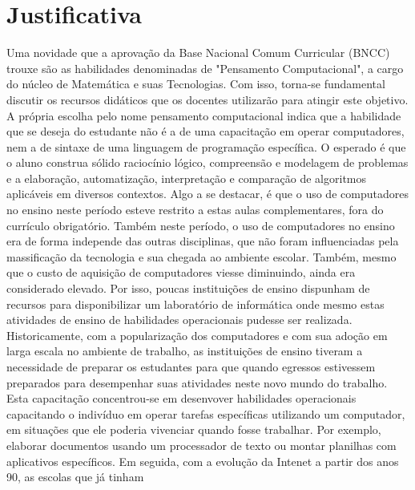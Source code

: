 \documentclass[12pt]{abntex2}
\begin{document}
\imprimircapa
\imprimirfolhaderosto
\section{Justificativa}
Uma novidade que a aprovação da Base Nacional Comum Curricular (BNCC) trouxe são as habilidades denominadas de "Pensamento Computacional", a cargo do núcleo de Matemática e suas Tecnologias. Com isso, torna-se fundamental discutir os recursos didáticos que os docentes utilizarão para atingir este objetivo. A própria escolha pelo nome pensamento computacional indica que a habilidade que se deseja do estudante não é a de uma capacitação em operar computadores, nem a de sintaxe de uma linguagem de programação específica. O esperado é que o aluno construa sólido raciocínio lógico, compreensão e modelagem de problemas e a elaboração, automatização, interpretação e comparação de algoritmos aplicáveis em diversos contextos. Algo a se destacar, é que o uso de computadores no ensino neste período esteve restrito a estas aulas complementares, fora do currículo obrigatório. Também neste período, o uso de computadores no ensino era de forma independe das outras disciplinas, que não foram influenciadas pela massificação da tecnologia e sua chegada ao ambiente escolar.
Também, mesmo que o custo de aquisição de computadores viesse diminuindo, ainda era considerado elevado. Por isso, poucas instituições de ensino dispunham de recursos para disponibilizar um laboratório de informática onde mesmo estas atividades de ensino de habilidades operacionais pudesse ser realizada. 
\\
Historicamente, com a popularização dos computadores e com sua adoção em larga escala no ambiente de trabalho, as instituições de ensino tiveram a necessidade de preparar os estudantes para que quando egressos estivessem preparados para desempenhar suas atividades neste novo mundo do trabalho. Esta capacitação concentrou-se em desenvover habilidades operacionais capacitando o indivíduo em operar tarefas específicas utilizando um computador, em situações que ele poderia vivenciar quando fosse trabalhar. Por exemplo, elaborar documentos usando um processador de texto ou montar planilhas com aplicativos específicos. Em seguida, com a evolução da Intenet a partir dos anos 90, as escolas que já tinham 
\end{document}
